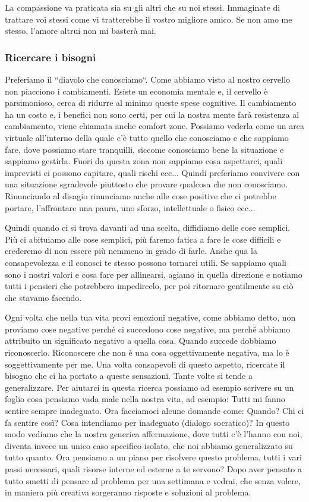 \documentclass[12pt]{book} %
\begin{document}
La compassione va praticata sia su gli altri che su noi stessi. Immaginate di trattare voi stessi come vi tratterebbe il
vostro migliore amico. Se non amo me stesso, l'amore altrui non mi basterà mai. 

\subsubsection{Ricercare i bisogni}
Preferiamo il “diavolo che conosciamo“. Come abbiamo visto al nostro cervello non piacciono i cambiamenti. Esiste un
economia mentale e, il cervello è parsimonioso, cerca di ridurre al minimo queste spese cognitive. Il cambiamento ha un
costo e, i benefici non sono certi, per cui la nostra mente farà resistenza al cambiamento, viene chiamata anche
comfort zone. Possiamo vederla come un area virtuale all'interno della quale c'è tutto quello che conosciamo e che
sappiamo fare, dove possiamo stare tranquilli, siccome conosciamo bene la situazione e sappiamo gestirla. Fuori da
questa zona non sappiamo cosa aspettarci, quali imprevisti ci possono capitare, quali rischi ecc... Quindi preferiamo
convivere con una situazione sgradevole piuttosto che provare qualcosa che non conosciamo. Rinunciando al disagio
rinunciamo anche alle cose positive che ci potrebbe portare, l'affrontare una paura, uno sforzo,
intellettuale o fisico ecc...

Quindi quando ci si trova davanti ad una scelta, diffidiamo delle cose semplici. Più ci abituiamo alle cose semplici,
più faremo fatica a fare le cose difficili e crederemo di non essere più nemmeno in grado di farle. Anche qua la
consapevolezza e il conosci te stesso possono tornarci utili. Se sappiamo quali sono i nostri valori e cosa fare per
allinearsi, agiamo in quella direzione e notiamo tutti i pensieri che potrebbero impedircelo, per poi ritornare
gentilmente su ciò che stavamo facendo.

Ogni volta che nella tua vita provi emozioni negative, come abbiamo detto, non proviamo cose negative perché ci
succedono cose negative, ma perché abbiamo attribuito un significato negativo a quella cosa. Quando succede dobbiamo
riconoscerlo. Riconoscere che non è una cosa oggettivamente negativa, ma lo è soggettivamente per me. Una volta
consapevoli di questo aspetto, ricercate il bisogno che ci ha portato a queste sensazioni. Tante volte si tende a
generalizzare. Per aiutarci in questa ricerca possiamo ad esempio scrivere su un foglio cosa pensiamo vada male nella
nostra vita, ad esempio: Tutti mi fanno sentire sempre inadeguato. Ora facciamoci alcune domande come: Quando? Chi ci
fa sentire così? Cosa intendiamo per inadeguato (dialogo socratico)? In questo modo vediamo che la nostra generica
affermazione, dove tutti c'è l'hanno con noi, diventa invece un unico caso specifico isolato, che noi abbiamo
generalizzato su tutto quanto. Ora pensiamo a un piano per risolvere questo problema, tutti i vari passi necessari,
quali risorse interne ed esterne a te servono? Dopo aver pensato a tutto smetti di pensare al problema per una
settimana e vedrai, che senza volere, in maniera più creativa sorgeranno risposte e soluzioni al problema.
\end{document}
